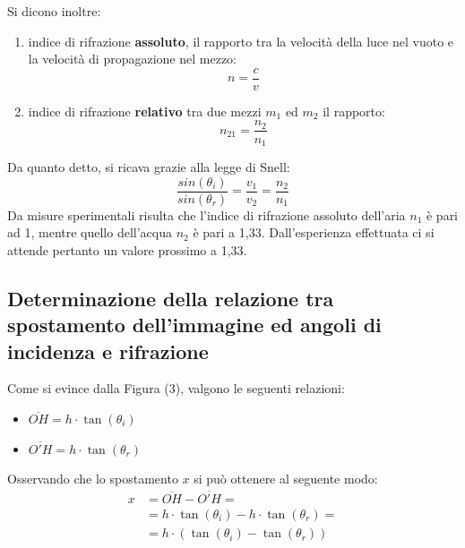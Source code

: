 Si dicono inoltre:
\begin{enumerate}
    \item indice di rifrazione \textbf{assoluto}, il rapporto tra la velocità della luce nel vuoto e la velocità di propagazione nel mezzo: 
    \begin{equation}
        n = \frac{c}{v}
    \end{equation}
    \item indice di rifrazione \textbf{relativo} tra due mezzi $m_1$ ed $m_2$ il rapporto:
    \begin{equation}
        n_{21} = \frac{n_2}{n_1}
    \end{equation}
\end{enumerate}
Da quanto detto, si ricava grazie alla legge di Snell:
\begin{equation}
    \frac{sin(\theta_i)}{sin(\theta_r)} = \frac{v_1}{v_2} = \frac{n_2}{n_1}
\end{equation}
Da misure sperimentali risulta che l'indice di rifrazione assoluto dell'aria $n_1$ è pari ad 1, mentre quello dell'acqua $n_2$ è pari a 1,33. Dall'esperienza effettuata ci si attende pertanto un valore prossimo a 1,33.

\subsection{Determinazione della relazione tra spostamento dell'immagine ed angoli di incidenza e rifrazione}
Come si evince dalla Figura (3), valgono le seguenti relazioni: 
\begin{itemize}
    \item $\overline{OH} = h \cdot \tan(\theta_i)$
    \item $\overline{O'H} = h \cdot \tan(\theta_r)$
\end{itemize}
Osservando che lo spostamento $x$ si può ottenere al seguente modo:
\begin{align}
    x &= \overline{OH} - \overline{O'H} =  \\
    &= h \cdot \tan(\theta_i) - h \cdot \tan(\theta_r) = \\
    &= h \cdot (\tan(\theta_i) - \tan(\theta_r))
\end{align}



